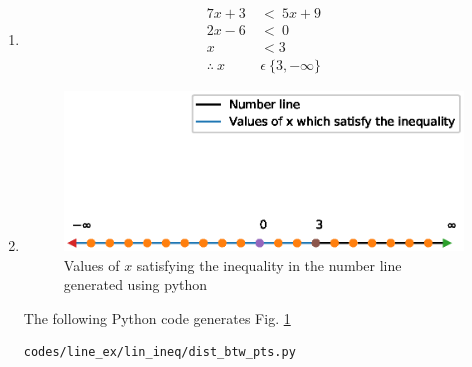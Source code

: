 \renewcommand{\theequation}{\theenumi}
\begin{enumerate}

\item \begin{align}
7x+3\ &<\ 5x+9 \\
2x - 6\  &< \  0 \\
x &< 3 \\
\therefore\  x\  &\epsilon\  \{3, -\infty \}
\end{align}

\item \begin{figure}[!ht]
\centering
\includegraphics[width=\columnwidth]{./figs/line_ex/lin_ineq/number_line.eps}
\caption{Values of $x$ satisfying the inequality in the number line generated using python}
\label{fig:numberline_lin_ineq}
\end{figure} 

The  following Python code generates Fig. \ref{fig:numberline_lin_ineq}
\begin{lstlisting}
codes/line_ex/lin_ineq/dist_btw_pts.py
\end{lstlisting}
\end{enumerate}




